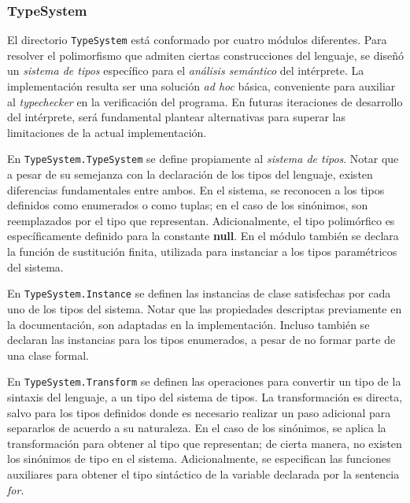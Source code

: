 \subsubsection{TypeSystem}

El directorio \lstinline[style = module]{TypeSystem} está conformado por cuatro módulos diferentes.
Para resolver el polimorfismo que admiten ciertas construcciones del lenguaje, se diseñó un \textit{sistema de tipos} específico para el \textit{análisis semántico} del intérprete.
La implementación resulta ser una solución \textit{ad hoc} básica, conveniente para auxiliar al \textit{typechecker} en la verificación del programa.
En futuras iteraciones de desarrollo del intérprete, será fundamental plantear alternativas para superar las limitaciones de la actual implementación.

En \lstinline[style = module]{TypeSystem.TypeSystem} se define propiamente al \textit{sistema de tipos}.
Notar que a pesar de su semejanza con la declaración de los tipos del lenguaje, existen diferencias fundamentales entre ambos.
En el sistema, se reconocen a los tipos definidos como enumerados o como tuplas; en el caso de los sinónimos, son reemplazados por el tipo que representan.
Adicionalmente, el tipo polimórfico es específicamente definido para la constante \textbf{null}.
En el módulo también se declara la función de sustitución finita, utilizada para instanciar a los tipos paramétricos del sistema.

En \lstinline[style = module]{TypeSystem.Instance} se definen las instancias de clase satisfechas por cada uno de los tipos del sistema.
Notar que las propiedades descriptas previamente en la documentación, son adaptadas en la implementación.
Incluso también se declaran las instancias para los tipos enumerados, a pesar de no formar parte de una clase formal.

En \lstinline[style = module]{TypeSystem.Transform} se definen las operaciones para convertir un tipo de la sintaxis del lenguaje, a un tipo del sistema de tipos.
La transformación es directa, salvo para los tipos definidos donde es necesario realizar un paso adicional para separarlos de acuerdo a su naturaleza.
En el caso de los sinónimos, se aplica la transformación para obtener al tipo que representan; de cierta manera, no existen los sinónimos de tipo en el sistema.
Adicionalmente, se especifican las funciones auxiliares para obtener el tipo sintáctico de la variable declarada por la sentencia \textit{for}.

